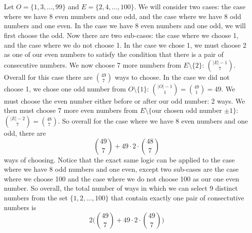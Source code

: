\documentclass{article}
\begin{document}
\section{} %
	Let $O=\{1,3,\ldots,99\}$ and $E=\{2,4,\ldots,100\}$.
	\newline
	\newline
	We will consider two cases: the case where we have 8 even numbers and one odd,
	and the case where we have 8 odd numbers and one even.
	\newline
	\newline
	In the case we have 8 even numbers and one odd, we will first choose the odd.
	Now there are two sub-cases: the case where we choose 1, and the case where we do not choose 1.
	In the case we chose 1, we must choose 2 as one of our even numbers to satisfy the condition that
	there is a pair of consecutive numbers. We now choose 7 more numbers from $E\setminus\{2\}$:
	${|E|-1}\choose7$. Overall for this case there are $49\choose7$ ways to choose.
	In the case we did not choose 1, we chose one odd number from $O\setminus\{1\}$:
	${{|O|-1}\choose1}={49\choose1}=49$. We must choose the even number either before or after our odd
	number: 2 ways. We then must choose 7 more even numbers from $E\setminus\{$our chosen odd number $\pm1\}$:
	${{|E|-2}\choose7}={48\choose7}$.
	\newline
	\newline
	So overall for the case where we have 8 even numbers and one odd, there are
	\[{49\choose7}+49\cdot2\cdot{48\choose7}\]
	ways of choosing.
	\newline
	\newline
	Notice that the exact same logic can be applied to the case where we have 8 odd numbers and one even,
	except two sub-cases are the case where we choose 100 and the case where we do not choose 100 as our
	one even number.
	\newline
	\newline
	So overall, the total number of ways in which we can select 9 distinct numbers from the set
	$\{1,2,\ldots,100\}$ that contain exactly one pair of consectutive numbers is
	\[2\Bigg({49\choose7}+49\cdot2\cdot{49\choose7}\Bigg)\]
\end{document}
